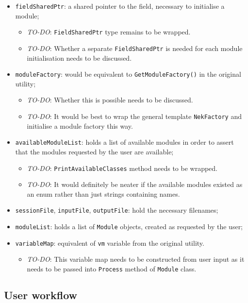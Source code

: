 \begin{itemize}
	\item \texttt{fieldSharedPtr}: a shared pointer to the field, necessary to 
	initialise a module;
	\begin{itemize}
		\item \emph{TO-DO}: \texttt{FieldSharedPtr} type remains to be wrapped.
		\item \emph{TO-DO}: Whether a separate \texttt{FieldSharedPtr} is 
		needed for each module initialisation needs to be discussed.
	\end{itemize}
	\item \texttt{moduleFactory}: would be equivalent to \texttt{GetModuleFactory()}
	in the original utility;
	\begin{itemize}
		\item \emph{TO-DO}: Whether this is possible needs to be discussed.
		\item \emph{TO-DO}: It would be best to wrap the general template 
		\texttt{NekFactory} and initialise a module factory this way.
	\end{itemize}
	\item \texttt{availableModuleList}: holds a list of available modules in 
	order to assert that the modules requested by the user are available;
	\begin{itemize}
		\item \emph{TO-DO}: \texttt{PrintAvailableClasses} method needs to 
		be wrapped.
		\item \emph{TO-DO}: It would definitely be neater if the available modules 
		existed as an enum rather than just strings containing names.
	\end{itemize}
	\item \texttt{sessionFile}, \texttt{inputFile}, \texttt{outputFile}: 
	hold the necessary filenames;
	\item \texttt{moduleList}: holds a list of \texttt{Module} objects, created as 
	requested by the user;
	\item \texttt{variableMap}: equivalent of \texttt{vm} variable from the original 
	utility.
	\begin{itemize}
		\item \emph{TO-DO}: This variable map needs to be constructed from user 
		input as it needs to be passed into \texttt{Process} method of 
		\texttt{Module} class.
	\end{itemize}
\end{itemize}

\subsection{User workflow}

